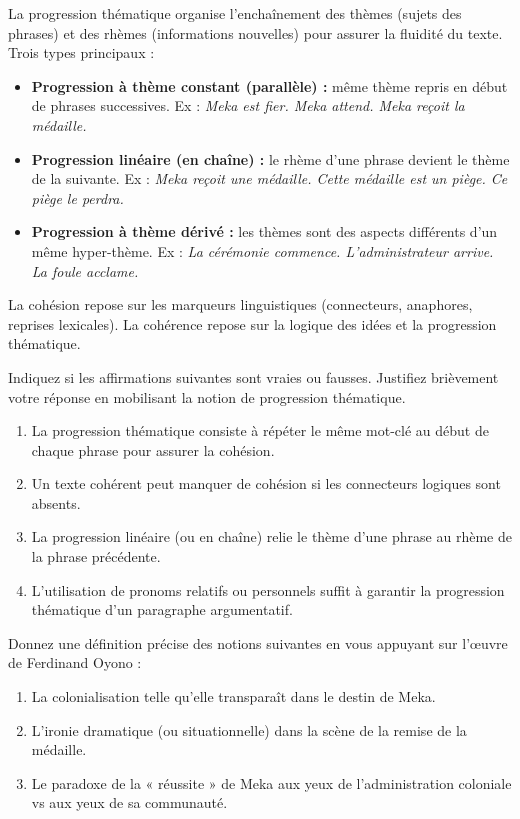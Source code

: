 \documentclass[11pt]{article}
\newcommand{\cle}[1]{{\popxbold\color{popdark}#1}}
\begin{document}
\begin{aretenir}
La \cle{progression thématique} organise l'enchaînement des thèmes (sujets des phrases) et des rhèmes (informations nouvelles) pour assurer la fluidité du texte. Trois types principaux :
\begin{itemize}
\item \textbf{Progression à thème constant (parallèle) :} même thème repris en début de phrases successives. Ex : \emph{Meka est fier. Meka attend. Meka reçoit la médaille.}
\item \textbf{Progression linéaire (en chaîne) :} le rhème d'une phrase devient le thème de la suivante. Ex : \emph{Meka reçoit une médaille. Cette médaille est un piège. Ce piège le perdra.}
\item \textbf{Progression à thème dérivé :} les thèmes sont des aspects différents d'un même hyper-thème. Ex : \emph{La cérémonie commence. L'administrateur arrive. La foule acclame.}
\end{itemize}
La \cle{cohésion} repose sur les marqueurs linguistiques (connecteurs, anaphores, reprises lexicales). La \cle{cohérence} repose sur la logique des idées et la progression thématique.
\end{aretenir}

\begin{exercice}
Indiquez si les affirmations suivantes sont vraies ou fausses. Justifiez brièvement votre réponse en mobilisant la notion de \cle{progression thématique}.
\begin{enumerate}
\item La progression thématique consiste à répéter le même mot-clé au début de chaque phrase pour assurer la cohésion.
\item Un texte cohérent peut manquer de cohésion si les connecteurs logiques sont absents.
\item La progression linéaire (ou en chaîne) relie le thème d'une phrase au rhème de la phrase précédente.
\item L'utilisation de pronoms relatifs ou personnels suffit à garantir la progression thématique d'un paragraphe argumentatif.
\end{enumerate}
\end{exercice}

\begin{exercice}
Donnez une définition précise des notions suivantes en vous appuyant sur l'œuvre de Ferdinand Oyono :
\begin{enumerate}
\item La \cle{colonialisation} telle qu'elle transparaît dans le destin de Meka.
\item L'\cle{ironie} dramatique (ou situationnelle) dans la scène de la remise de la médaille.
\item Le \cle{paradoxe} de la « réussite » de Meka aux yeux de l'administration coloniale vs aux yeux de sa communauté.
\end{enumerate}
\end{exercice}
\end{document}
